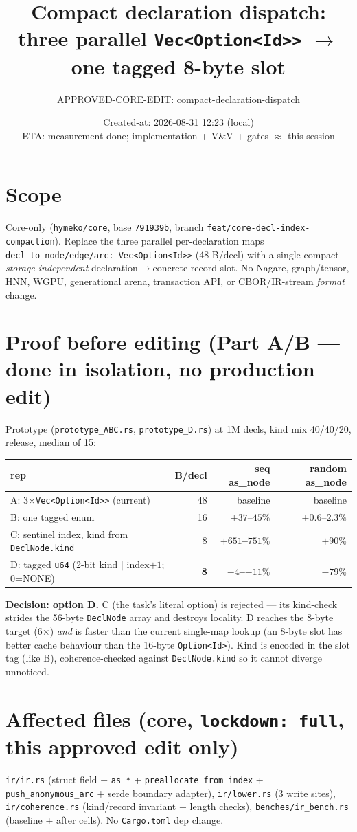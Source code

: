 \documentclass[11pt]{article}
\title{Compact declaration dispatch: three parallel \texttt{Vec<Option<Id>>} $\to$ one tagged 8-byte slot}
\author{APPROVED-CORE-EDIT: compact-declaration-dispatch}
\date{Created-at: 2026-08-31 12:23 (local) \\ ETA: measurement done; implementation + V\&V + gates $\approx$ this session}
\begin{document}
\maketitle

\section*{Scope}
Core-only (\texttt{hymeko/core}, base \texttt{791939b}, branch
\texttt{feat/core-decl-index-compaction}). Replace the three parallel per-declaration
maps \texttt{decl\_to\_node/edge/arc: Vec<Option<Id>>} (48 B/decl) with a single compact
\emph{storage-independent} declaration$\to$concrete-record slot. No Nagare, graph/tensor,
HNN, WGPU, generational arena, transaction API, or CBOR/IR-stream \emph{format} change.

\section*{Proof before editing (Part A/B --- done in isolation, no production edit)}
Prototype (\texttt{prototype\_ABC.rs}, \texttt{prototype\_D.rs}) at 1M decls, kind mix
40/40/20, release, median of 15:
\begin{longtable}{lrrr}\toprule
rep & B/decl & seq as\_node & random as\_node \\\midrule
A: 3$\times$\texttt{Vec<Option<Id>>} (current) & 48 & baseline & baseline \\
B: one tagged enum & 16 & $+37$--$45\%$ & $+0.6$--$2.3\%$ \\
C: sentinel index, kind from \texttt{DeclNode.kind} & 8 & \textbf{$+651$--$751\%$} & \textbf{$+90\%$} \\
D: tagged \texttt{u64} (2-bit kind $|$ index$+1$; 0=NONE) & \textbf{8} & \textbf{$-4$--$-11\%$} & \textbf{$-79\%$} \\\bottomrule
\end{longtable}
\textbf{Decision: option D.} C (the task's literal option) is rejected --- its kind-check
strides the 56-byte \texttt{DeclNode} array and destroys locality. D reaches the 8-byte
target (6$\times$) \emph{and} is faster than the current single-map lookup (an 8-byte slot
has better cache behaviour than the 16-byte \texttt{Option<Id>}). Kind is encoded in the
slot tag (like B), coherence-checked against \texttt{DeclNode.kind} so it cannot diverge
unnoticed.

\section*{Affected files (core, \texttt{lockdown: full}, this approved edit only)}
\texttt{ir/ir.rs} (struct field + \texttt{as\_*} + \texttt{preallocate\_from\_index} +
\texttt{push\_anonymous\_arc} + serde boundary adapter), \texttt{ir/lower.rs} (3 write
sites), \texttt{ir/coherence.rs} (kind/record invariant + length checks),
\texttt{benches/ir\_bench.rs} (baseline + after cells). No \texttt{Cargo.toml} dep change.
\end{document}
